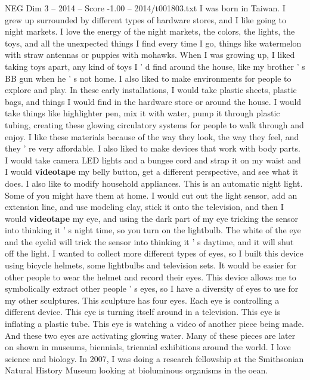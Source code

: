 \begin{textsample}{NEG Dim 3 – 2014 – Score -1.00 – 2014/t001803.txt}  \label{ex:f3_neg_047}
I was born in Taiwan.
I grew up surrounded by different types of hardware stores, and I like going to night markets.
I love the energy of the night markets, the colors, the lights, the toys, and all the unexpected things I find every time I go, things like watermelon with straw antennas or puppies with mohawks.
When I was growing up, I liked taking toys apart, any kind of toys I ' d find around the house, like my brother ' s BB gun when he ' s not home.
I also liked to make environments for people to explore and play.
In these early installations, I would take plastic sheets, plastic bags, and things I would find in the hardware store or around the house.
I would take things like highlighter pen, mix it with water, pump it through plastic tubing, creating these glowing circulatory systems for people to walk through and enjoy.
I like these materials because of the way they look, the way they feel, and they ' re very affordable.
I also liked to make devices that work with body parts.
I would take camera LED lights and a bungee cord and strap it on my waist and I would \textbf{videotape} my belly button, get a different perspective, and see what it does.
I also like to modify household appliances.
This is an automatic night light.
Some of you might have them at home.
I would cut out the light sensor, add an extension line, and use modeling clay, stick it onto the television, and then I would \textbf{videotape} my eye, and using the dark part of my eye tricking the sensor into thinking it ' s night time, so you turn on the lightbulb.
The white of the eye and the eyelid will trick the sensor into thinking it ' s daytime, and it will shut off the light.
I wanted to collect more different types of eyes, so I built this device using bicycle helmets, some lightbulbs and television sets.
It would be easier for other people to wear the helmet and record their eyes.
This device allows me to symbolically extract other people ' s eyes, so I have a diversity of eyes to use for my other sculptures.
This sculpture has four eyes.
Each eye is controlling a different device.
This eye is turning itself around in a television.
This eye is inflating a plastic tube.
This eye is watching a video of another piece being made.
And these two eyes are activating glowing water.
Many of these pieces are later on shown in museums, biennials, triennial exhibitions around the world.
I love science and biology.
In 2007, I was doing a research fellowship at the Smithsonian Natural History Museum looking at bioluminous organisms in the oean.

\end{textsample}
